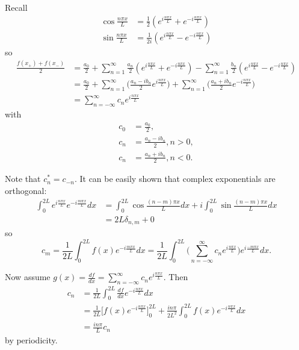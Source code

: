 \documentclass[a4paper]{article}
\begin{document}
Recall
\begin{align*}
  \cos \frac{n\pi x }{L} &= \frac{1}{2} (e^{i\frac{n\pi x}{L}} + e^{-i\frac{n\pi x}{L}}) \\
  \sin \frac{n\pi x }{L} &= \frac{1}{2i} (e^{i\frac{n\pi x}{L}} - e^{-i\frac{n\pi x}{L}})
\end{align*}
so
\begin{align*}
  \frac{f(x_+)+f(x_-)}{2} &= \frac{a_0}{2} + \sum_{n=1}^{\infty} \frac{a_n}{2} (e^{i \frac{n\pi x}{L}} + e^{-i \frac{n \pi x}{L}}) - \sum_{n=1}^{\infty} \frac{b_n}{2} (e^{i \frac{n\pi x}{L}} - e^{-i \frac{n \pi x}{L}})\\
                          &= \frac{a_0}{2} + \sum_{n=1}^{\infty} \big( \frac{a_n-i b_n}{2} e^{i \frac{n\pi x}{L}} \big) + \sum_{n=1}^{\infty} \big( \frac{a_n+i b_n}{2} e^{-i \frac{n\pi x}{L}} \big) \\
                          &= \sum_{n=-\infty}^{\infty} c_n e^{i\frac{n\pi x}{L}}
\end{align*}
with
\begin{align*}
  c_0 &= \frac{a_0}{2}, \\
  c_n &= \frac{a_n-ib_n}{2}, n>0, \\
  c_n &= \frac{a_n+ib_n}{2}, n<0.
\end{align*}

Note that \(c_n^* = c_{-n}\). It can be easily shown that complex exponentials are orthogonal:
\begin{align*}
  \int_{0}^{2L} e^{i\frac{n\pi x}{L}} e^{-i\frac{m\pi x}{L}}dx &= \int_{0}^{2L}\cos \frac{(n-m)\pi x}{L}dx + i \int_{0 }^{2L}\sin \frac{(n-m)\pi x}{L} dx \\
  &= 2L \delta_{n,m} + 0
\end{align*}
so
\[
  c_m = \frac{1}{2L} \int_{0}^{2L}f(x)e^{-i\frac{m\pi x}{L}} dx = \frac{1}{2L} \int_{0}^{2L} \Big( \sum_{n=-\infty}^{\infty} c_n e^{i\frac{n\pi x}{L}} \Big) e^{i\frac{-m\pi x}{L}} dx.
\]

Now assume \(g(x) = \frac{df}{dx} = \sum_{n=-\infty}^{\infty} c_n e^{i\frac{n\pi x}{L}}\). Then
\begin{align*}
  c_n &= \frac{1}{2L}\int_{0}^{2L} \frac{df}{dx }e^{-i\frac{n\pi x}{L}}dx \\
      &= \frac{1}{2L} \Big[ f(x) e^{-i\frac{n\pi x}{L}} \Big]_0^{2L} + \frac{in\pi}{2L^2} \int_{0}^{2L}f(x) e^{-i\frac{n\pi x}{L}} dx \\
      &= \frac{in\pi}{L}c_n
\end{align*}
by periodicity.
\end{document}
